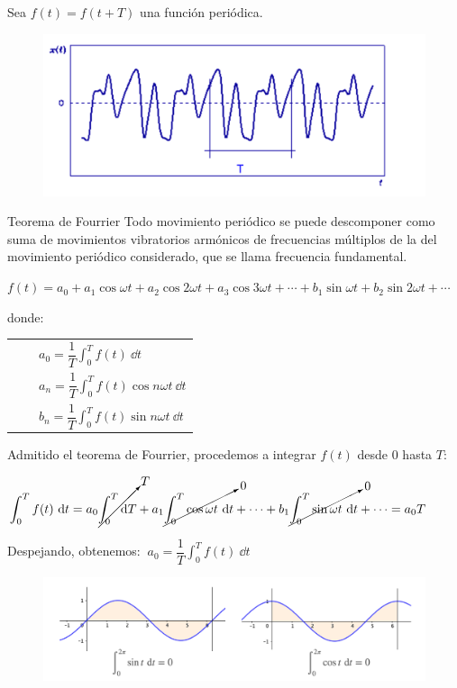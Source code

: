 Sea $f(t)=f(t+T)$ una función periódica.
\begin{figure}[H]
		\centering
		\includegraphics[width=.75\textwidth]{imagenes/imagenes20/T20IM10.png}
	\end{figure}	

\begin{teor}{Teorema de Fourrier}
Todo movimiento periódico se puede descomponer como suma de movimientos vibratorios armónicos de frecuencias múltiplos de la del movimiento periódico considerado, que se llama frecuencia fundamental.	
\end{teor}

$f(t)=a_0+a_1\cos \omega t +a_2\cos 2\omega t +a_3\cos 3\omega t + \cdots + b_1\sin \omega t +b_2\sin 2\omega t  + \cdots$

donde: 
\begin{table}[H]
\begin{tabular}{l}
$\qquad a_0=\displaystyle \dfrac 1 T \int_0^T f(t) \ \dd t$ \\
$\qquad a_n=\displaystyle \dfrac 1 T \int_0^T f(t) \cos n\omega t \  \dd t$ \\
$\qquad b_n=\displaystyle \dfrac 1 T \int_0^T f(t) \sin n\omega t \ \dd t$
\end{tabular}
\end{table}

Admitido el teorema de Fourrier, procedemos a integrar $f(t)$ desde $0$ hasta $T$:

\hspace{-5mm}\small{$\displaystyle \int_0^T f(t)\ \dd t= a_0 \cancelto{T}{\int_0^T \dd T} + a_1 \cancelto{0}{\int_0^T \cos \omega t \ \dd t}+ \cdots + b_1\cancelto{0}{\int_0^T \sin \omega t \ \dd t}+ \cdots =a_0T$}

\normalsize{Despejando, obtenemos:} $\ a_0=\displaystyle \dfrac 1 T \int_0^T f(t)\ \dd t$

\begin{figure}[H]
		\centering
		\includegraphics[width=1\textwidth]{imagenes/imagenes20/T20IM11.png}
	\end{figure}

